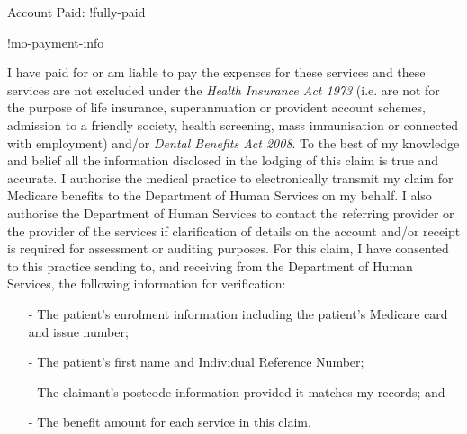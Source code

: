 \documentclass[12pt]{article}
\begin{document}
\vspace{3mm}

Account Paid: !fully-paid

\begin{spacing}{0.3}

\vspace{1mm}
  
  {\footnotesize

    !mo-payment-info} 

 \vspace{3mm}

{\tiny
 
I have paid for or am liable to pay the expenses for these services and these services are not excluded under the \emph{Health Insurance Act 1973} (i.e. are not for the purpose of life insurance, superannuation or provident account schemes, admission to a friendly society, health screening, mass immunisation or connected with employment) and/or \emph{Dental Benefits Act 2008}. To the best of my knowledge and belief all the information disclosed in the lodging of this claim is true and accurate. I authorise the medical practice to electronically transmit my claim for Medicare benefits to the Department of Human Services on my behalf. I also authorise the Department of Human Services to contact the referring provider or the provider of the services if clarification of details on the account and/or receipt is required for assessment or auditing purposes. 
For this claim, I have consented to this practice sending to, and receiving from the Department of Human Services, the following information for verification:

\vspace{1mm}

\begin{itemize}[noitemsep,nolistsep]
  \item[-] The patient’s enrolment information including the patient’s Medicare card and issue number; 
  \item[-] The patient’s first name and Individual Reference Number; 
  \item[-] The claimant’s postcode information provided it matches my records; and 
  \item[-] The benefit amount for each service in this claim.
\end{itemize}

\vspace{1mm}

}
\end{spacing}
\end{document}
